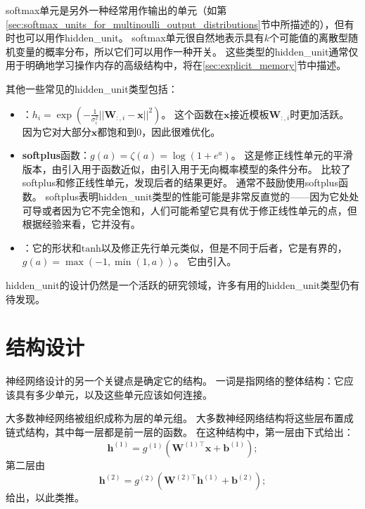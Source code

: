 

softmax单元是另外一种经常用作输出的单元（如第\ref{sec:softmax_units_for_multinoulli_output_distributions}节中所描述的），但有时也可以用作\gls{hidden_unit}。
softmax单元很自然地表示具有$k$个可能值的离散型随机变量的概率分布，所以它们可以用作一种开关。
这些类型的\gls{hidden_unit}通常仅用于明确地学习操作内存的高级结构中，将在\ref{sec:explicit_memory}节中描述。

其他一些常见的\gls{hidden_unit}类型包括：
\begin{itemize}
\item {}：$h_i = \exp \left (-\frac{1}{\sigma_i^2}|| \bm{W}_{:,i}-\bm{x}||^2 \right )$。
这个函数在$\bm{x}$接近模板$\bm{W}_{:,i}$时更加活跃。
因为它对大部分$\bm{x}$都饱和到0，因此很难优化。

\item \textbf{\gls{softplus}}函数：$g(a)=\zeta(a)=\log(1+e^a)$。
这是修正线性单元的平滑版本，由\cite{Dugas01}引入用于函数近似，由\cite{Nair-2010-small}引入用于无向概率模型的条件分布。
\cite{Glorot+al-AI-2011-small}比较了softplus和修正线性单元，发现后者的结果更好。
通常不鼓励使用softplus函数。
softplus表明\gls{hidden_unit}类型的性能可能是非常反直觉的——因为它处处可导或者因为它不完全饱和，人们可能希望它具有优于修正线性单元的点，但根据经验来看，它并没有。

\item {}：它的形状和$\text{tanh}$以及修正先行单元类似，但是不同于后者，它是有界的，$g(a)=\max(-1, \min(1,a))$。
它由\cite{Collobert04}引入。
\end{itemize}

\gls{hidden_unit}的设计仍然是一个活跃的研究领域，许多有用的\gls{hidden_unit}类型仍有待发现。

\section{结构设计}
\label{sec:architecture_design}

神经网络设计的另一个关键点是确定它的结构。
一词是指网络的整体结构：它应该具有多少单元，以及这些单元应该如何连接。


大多数神经网络被组织成称为层的单元组。
大多数神经网络结构将这些层布置成链式结构，其中每一层都是前一层的函数。
在这种结构中，第一层由下式给出：
\begin{equation}
\bm{h}^{(1)}= g^{(1)}\left ( \bm{W}^{(1)\top} \bm{x} + \bm{b}^{(1)}\right );
\end{equation}
第二层由
\begin{equation}
\bm{h}^{(2)} = g^{(2)}\left ( \bm{W}^{(2)\top}\bm{h}^{(1)}+\bm{b}^{(2)} \right );
\end{equation}
给出，以此类推。

